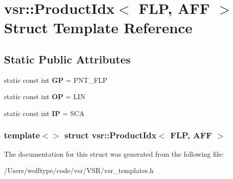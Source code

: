 \hypertarget{structvsr_1_1_product_idx_3_01_f_l_p_00_01_a_f_f_01_4}{\section{vsr\-:\-:Product\-Idx$<$ F\-L\-P, A\-F\-F $>$ Struct Template Reference}
\label{structvsr_1_1_product_idx_3_01_f_l_p_00_01_a_f_f_01_4}
}
\subsection*{Static Public Attributes}
\begin{DoxyCompactItemize}
\item 
\hypertarget{structvsr_1_1_product_idx_3_01_f_l_p_00_01_a_f_f_01_4_ae992e7141a0783b9031eb4e283e1dbe4}{static const int {\bfseries G\-P} = P\-N\-T\-\_\-\-F\-L\-P}\label{structvsr_1_1_product_idx_3_01_f_l_p_00_01_a_f_f_01_4_ae992e7141a0783b9031eb4e283e1dbe4}

\item 
\hypertarget{structvsr_1_1_product_idx_3_01_f_l_p_00_01_a_f_f_01_4_ab9ad8df8b76f0396e65fd65acc864e75}{static const int {\bfseries O\-P} = L\-I\-N}\label{structvsr_1_1_product_idx_3_01_f_l_p_00_01_a_f_f_01_4_ab9ad8df8b76f0396e65fd65acc864e75}

\item 
\hypertarget{structvsr_1_1_product_idx_3_01_f_l_p_00_01_a_f_f_01_4_a08bd91970644b6f812149aeb27ee7904}{static const int {\bfseries I\-P} = S\-C\-A}\label{structvsr_1_1_product_idx_3_01_f_l_p_00_01_a_f_f_01_4_a08bd91970644b6f812149aeb27ee7904}

\end{DoxyCompactItemize}
\subsubsection*{template$<$$>$ struct vsr\-::\-Product\-Idx$<$ F\-L\-P, A\-F\-F $>$}



The documentation for this struct was generated from the following file\-:\begin{DoxyCompactItemize}
\item 
/\-Users/wolftype/code/vsr/\-V\-S\-R/vsr\-\_\-templates.\-h\end{DoxyCompactItemize}
